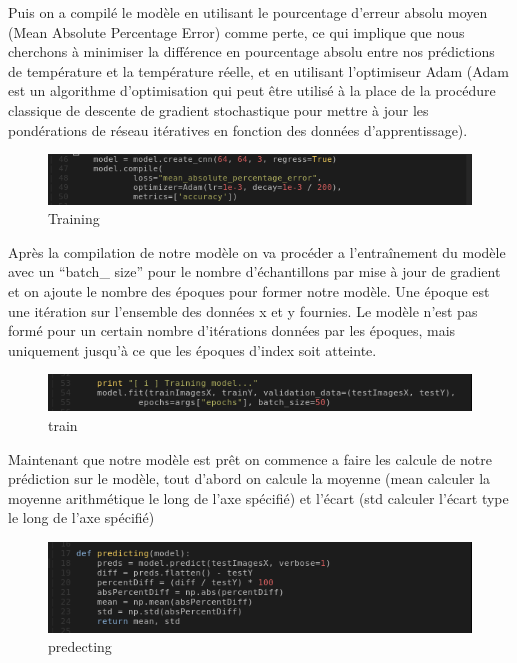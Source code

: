 \documentclass[12pt]{article}
\begin{document}
Puis on a compilé le modèle en utilisant le pourcentage d'erreur absolu moyen (Mean Absolute Percentage Error) comme perte, ce qui implique que nous cherchons à minimiser la différence en pourcentage absolu entre nos prédictions de température et la température réelle, et en utilisant l'optimiseur Adam (Adam est un algorithme d'optimisation qui peut être utilisé à la place de la procédure classique de descente de gradient stochastique pour mettre à jour les pondérations de réseau itératives en fonction des données d'apprentissage).

\begin{figure}[h]
	\centering
	\includegraphics[width=15cm]{img-Chapiter-4/training.png}
	\caption{Training}
\end{figure}

Après la compilation de notre modèle on va procéder a l’entraînement du modèle avec un “batch\_ size” pour le nombre d'échantillons par mise à jour de gradient et on ajoute le nombre des époques pour former notre modèle. Une époque est une itération sur l'ensemble des données x et y fournies. Le modèle n'est pas formé pour un certain nombre d'itérations données par les époques, mais uniquement jusqu'à ce que les époques d'index soit atteinte.

\begin{figure}[h]
	\centering
	\includegraphics[width=15cm]{img-Chapiter-4/train.png}
	\caption{train}
\end{figure}

Maintenant que notre modèle est prêt on commence a faire les calcule de notre prédiction sur le modèle, tout d'abord on calcule la moyenne (mean calculer la moyenne arithmétique le long de l'axe spécifié) et l’écart (std calculer l'écart type le long de l'axe spécifié)

\begin{figure}[h]
	\centering
	\includegraphics[width=15cm]{img-Chapiter-4/predecting.png}
	\caption{predecting}
\end{figure}
\end{document}

